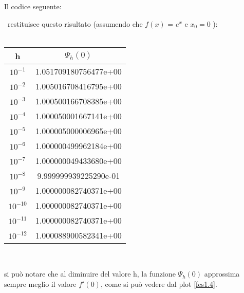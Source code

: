 Il codice seguente:

\newpage
\
restituisce questo risultato (assumendo che $f(x)$ = \( e^x \) e \( x_0 = 0 \) ): 
\\\
\begin{center}
\begin{tabular}{c|c}
h & \( \Psi_{h}(0) \)  \\
\hline
    \(10^{-1}\) & 1.051709180756477e+00\\
    \(10^{-2}\) & 1.005016708416795e+00\\
    \(10^{-3}\) & 1.000500166708385e+00\\
    \(10^{-4}\) & 1.000050001667141e+00\\
    \(10^{-5}\) & 1.000005000006965e+00\\
    \(10^{-6}\) & 1.000000499962184e+00\\
    \(10^{-7}\) & 1.000000049433680e+00\\
    \(10^{-8}\) & 9.999999939225290e-01\\
    \(10^{-9}\) & 1.000000082740371e+00\\
    \(10^{-10}\) & 1.000000082740371e+00\\
    \(10^{-11}\) & 1.000000082740371e+00\\
    \(10^{-12}\) & 1.000088900582341e+00\\
\end{tabular} \\
\end{center}
si può notare che al diminuire del valore h, la funzione \(\Psi_{h}(0)\) approssima sempre meglio il valore $f'(0)$, come si può vedere dal plot \ref{fes1.4}.